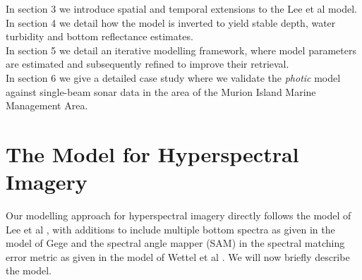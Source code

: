 \documentclass[12pt]{article}
\numberwithin{equation}{section}
\begin{document}
In section 3 we introduce spatial and temporal extensions to the Lee et al model. \\ 

In section 4 we detail how the model is inverted to yield stable depth, water turbidity and 
bottom reflectance estimates. \\

In section 5 we detail an iterative modelling framework, where model parameters are 
estimated and subsequently refined to improve their retrieval. \\

In section 6 we give a detailed case study where we validate the \textit{photic} model 
against single-beam sonar data in the area of the Murion Island Marine Management Area. 

\section{The Model for Hyperspectral Imagery}

Our modelling approach for hyperspectral imagery directly follows the model of Lee et 
al \cite{lee1998}\cite{lee1999}\cite{lee2001}, with additions to include multiple bottom 
spectra as given in the model of Gege \cite{gege2004} and the spectral angle mapper 
(SAM) in the spectral matching error metric as given in the model of Wettel et 
al \cite{wettle2006}. We will now briefly describe the model. \\
\end{document}
